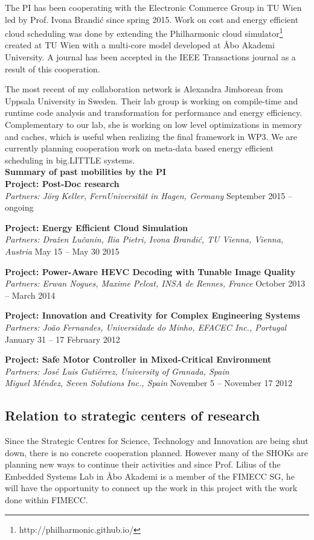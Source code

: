 \documentclass{article}
\begin{document}
The PI has been cooperating with the Electronic Commerce Group in TU Wien led by Prof. Ivona Brandi\'{c} since spring 2015. 
Work on cost and energy efficient cloud scheduling was done by extending the Philharmonic cloud simulator\footnote{http://philharmonic.github.io/} created at TU Wien with a multi-core model developed at \AA{}bo Akademi University. 
A journal has been accepted in the IEEE Transactions journal as a result of this cooperation.

The most recent of my collaboration network is Alexandra Jimborean from Uppsala University in Sweden.
Their lab group is working on compile-time and runtime code analysis and transformation for performance and energy efficiency.
Complementary to our lab, she is working on low level optimizations in memory and caches, which is useful when realizing the final framework in WP3.
We are currently planning cooperation work on meta-data based energy efficient scheduling in big.LITTLE systems.\\

\textbf{Summary of past mobilities by the PI}\\

\textbf{Project: Post-Doc research}\\
\textsl{Partners: J\"{o}rg Keller, FernUniversit\"{a}t in Hagen, Germany}
\hfill September 2015 -- ongoing

\textbf{Project: Energy Efficient Cloud Simulation}\\
\textsl{Partners: Dra\v{z}en Lu\v{c}anin, Ilia Pietri, Ivona Brandi\'{c}, TU Vienna, Vienna, Austria}
\hfill May 15 -- May 30 2015

\textbf{Project: Power-Aware HEVC Decoding with Tunable Image Quality}\\
\textsl{Partners: Erwan Nogues, Maxime Pelcat, INSA de Rennes, France}
\hfill October 2013 -- March 2014

\textbf{Project: Innovation and Creativity for Complex Engineering Systems}\\
\textsl{Partners: Jo\~{a}o Fernandes, Universidade do Minho, EFACEC Inc., Portugal}
\hfill January 31 -- 17 February 2012

\textbf{Project: Safe Motor Controller in Mixed-Critical Environment}\\
\textsl{Partners: Jos\'{e} Luis Guti\'{e}rrez, University of Granada, Spain \\ Miguel M\'{e}ndez, Seven Solutions Inc., Spain} 
\hfill November 5 -- November 17 2012

\subsection{Relation to strategic centers of research}
Since the Strategic Centres for Science, Technology and Innovation are being shut down, there is no concrete cooperation planned. 
However many of the SHOKs are planning new ways to continue their activities and since Prof. Lilius of the Embedded Systems Lab in \AA{}bo Akademi is a member of the FIMECC SG, 
he will have the opportunity to connect up the work in this project with the work done within FIMECC.
\end{document}
